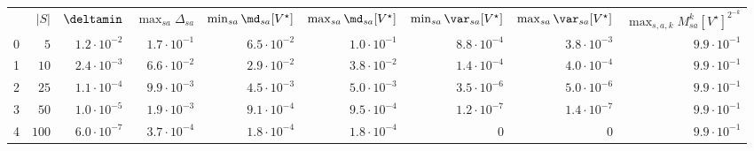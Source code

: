 \begin{tabular}{lrrrrrrrr}
 & $|S|$ & $\deltamin$ & $\max_{sa} \Delta_{sa}$ & $\min_{sa} \md_{sa}[V^\star]$ & $\max_{sa} \md_{sa}[V^\star]$ & $\min_{sa} \var_{sa}[V^\star]$ & $\max_{sa} \var_{sa}[V^\star]$ & $\max_{s,a,k} M_{sa}^k[V^\star]^{2^{-k}}$ \\
0 & $5$ & $1.2\cdot 10^{-2}$ & $1.7\cdot 10^{-1}$ & $6.5\cdot 10^{-2}$ & $1.0\cdot 10^{-1}$ & $8.8\cdot 10^{-4}$ & $3.8\cdot 10^{-3}$ & $9.9\cdot 10^{-1}$ \\
1 & $10$ & $2.4\cdot 10^{-3}$ & $6.6\cdot 10^{-2}$ & $2.9\cdot 10^{-2}$ & $3.8\cdot 10^{-2}$ & $1.4\cdot 10^{-4}$ & $4.0\cdot 10^{-4}$ & $9.9\cdot 10^{-1}$ \\
2 & $25$ & $1.1\cdot 10^{-4}$ & $9.9\cdot 10^{-3}$ & $4.5\cdot 10^{-3}$ & $5.0\cdot 10^{-3}$ & $3.5\cdot 10^{-6}$ & $5.0\cdot 10^{-6}$ & $9.9\cdot 10^{-1}$ \\
3 & $50$ & $1.0\cdot 10^{-5}$ & $1.9\cdot 10^{-3}$ & $9.1\cdot 10^{-4}$ & $9.5\cdot 10^{-4}$ & $1.2\cdot 10^{-7}$ & $1.4\cdot 10^{-7}$ & $9.9\cdot 10^{-1}$ \\
4 & $100$ & $6.0\cdot 10^{-7}$ & $3.7\cdot 10^{-4}$ & $1.8\cdot 10^{-4}$ & $1.8\cdot 10^{-4}$ & $0$ & $0$ & $9.9\cdot 10^{-1}$ \\
\end{tabular}

